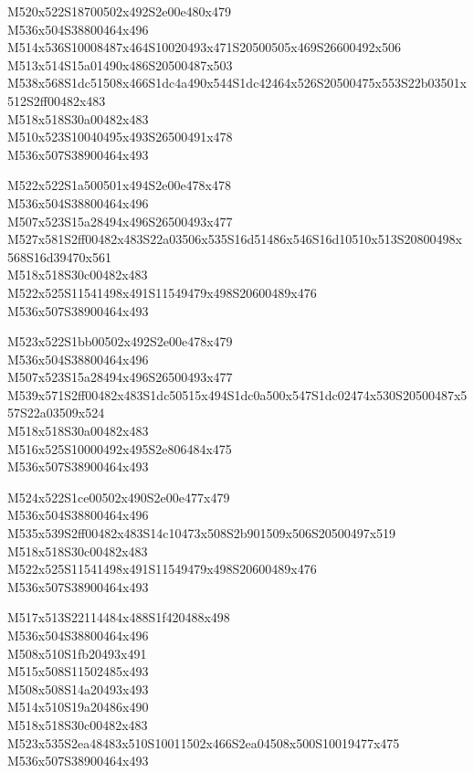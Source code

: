 \documentclass{article}
\begin{document}
\begin{multicols}{5}
\begin{center}
M520x522S18700502x492S2e00e480x479 %
\\M536x504S38800464x496 %
\\M514x536S10008487x464S10020493x471S20500505x469S26600492x506 %
\\M513x514S15a01490x486S20500487x503 %
\\M538x568S1dc51508x466S1dc4a490x544S1dc42464x526S20500475x553S22b03501x512S2ff00482x483 %
\\M518x518S30a00482x483 %
\\M510x523S10040495x493S26500491x478 %
\\M536x507S38900464x493 %
\vfil
\columnbreak

M522x522S1a500501x494S2e00e478x478 %
\\M536x504S38800464x496 %
\\M507x523S15a28494x496S26500493x477 %
\\M527x581S2ff00482x483S22a03506x535S16d51486x546S16d10510x513S20800498x568S16d39470x561 %
\\M518x518S30c00482x483 %
\\M522x525S11541498x491S11549479x498S20600489x476 %
\\M536x507S38900464x493 %
\vfil
\columnbreak

M523x522S1bb00502x492S2e00e478x479 %
\\M536x504S38800464x496 %
\\M507x523S15a28494x496S26500493x477 %
\\M539x571S2ff00482x483S1dc50515x494S1dc0a500x547S1dc02474x530S20500487x557S22a03509x524 %
\\M518x518S30a00482x483 %
\\M516x525S10000492x495S2e806484x475 %
\\M536x507S38900464x493 %
\vfil
\columnbreak

M524x522S1ce00502x490S2e00e477x479 %
\\M536x504S38800464x496 %
\\M535x539S2ff00482x483S14c10473x508S2b901509x506S20500497x519 %
\\M518x518S30c00482x483 %
\\M522x525S11541498x491S11549479x498S20600489x476 %
\\M536x507S38900464x493 %
\vfil
\columnbreak

M517x513S22114484x488S1f420488x498 %
\\M536x504S38800464x496 %
\\M508x510S1fb20493x491 %
\\M515x508S11502485x493 %
\\M508x508S14a20493x493 %
\\M514x510S19a20486x490 %
\\M518x518S30c00482x483 %
\\M523x535S2ea48483x510S10011502x466S2ea04508x500S10019477x475 %
\\M536x507S38900464x493 %
\end{center}
\end{multicols}
\end{document}
